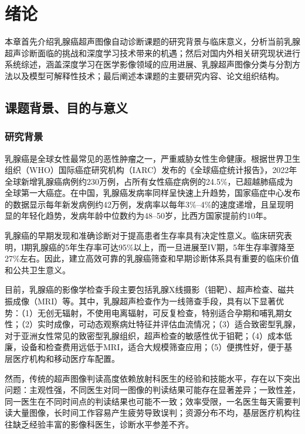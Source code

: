 \section{绪\hspace{1em}论}
本章首先介绍乳腺癌超声图像自动诊断课题的研究背景与临床意义，分析当前乳腺超声诊断面临的挑战和深度学习技术带来的机遇；然后对国内外相关研究现状进行系统综述，涵盖深度学习在医学影像领域的应用进展、乳腺超声图像分类与分割方法以及模型可解释性技术；最后阐述本课题的主要研究内容、论文组织结构。


\subsection{课题背景、目的与意义}

\subsubsection{研究背景}

乳腺癌是全球女性最常见的恶性肿瘤之一，严重威胁女性生命健康。根据世界卫生组织（WHO）国际癌症研究机构（IARC）发布的《全球癌症统计报告》，2022年全球新增乳腺癌病例约230万例，占所有女性癌症病例的24.5\%，已超越肺癌成为全球第一大癌症\cite{sung2021global}。在中国，乳腺癌发病率同样呈快速上升趋势，国家癌症中心发布的数据显示每年新发病例约42万例，发病率以每年3\%--4\%的速度递增，且呈现明显的年轻化趋势，发病年龄中位数约为48--50岁，比西方国家提前约10年\cite{zheng2022cancer}。

乳腺癌的早期发现和准确诊断对于提高患者生存率具有决定性意义。临床研究表明，I期乳腺癌的5年生存率可达95\%以上，而一旦进展至IV期，5年生存率骤降至27\%左右\cite{siegel2023cancer}。因此，建立高效可靠的乳腺癌筛查和早期诊断体系具有重要的临床价值和公共卫生意义。

目前，乳腺癌的影像学检查手段主要包括乳腺X线摄影（钼靶）、超声检查、磁共振成像（MRI）等。其中，乳腺超声检查作为一线筛查手段，具有以下显著优势：（1）无创无辐射，不使用电离辐射，可反复检查，特别适合孕期和哺乳期女性；（2）实时成像，可动态观察病灶特征并评估血流情况；（3）适合致密型乳腺，对于亚洲女性常见的致密型乳腺组织，超声检查的敏感性优于钼靶；（4）成本低廉，设备和检查费用远低于MRI，适合大规模筛查应用；（5）便携性好，便于基层医疗机构和移动医疗车配置\cite{aldhabyani2020dataset}。

然而，传统的超声图像判读高度依赖放射科医生的经验和技能水平，存在以下突出问题：主观性强，不同医生对同一图像的判读结果可能存在显著差异；一致性差，同一医生在不同时间点的判读结果也可能不一致；效率受限，一名医生每天需要判读大量图像，长时间工作容易产生疲劳导致误判；资源分布不均，基层医疗机构往往缺乏经验丰富的影像科医生，诊断水平参差不齐。

